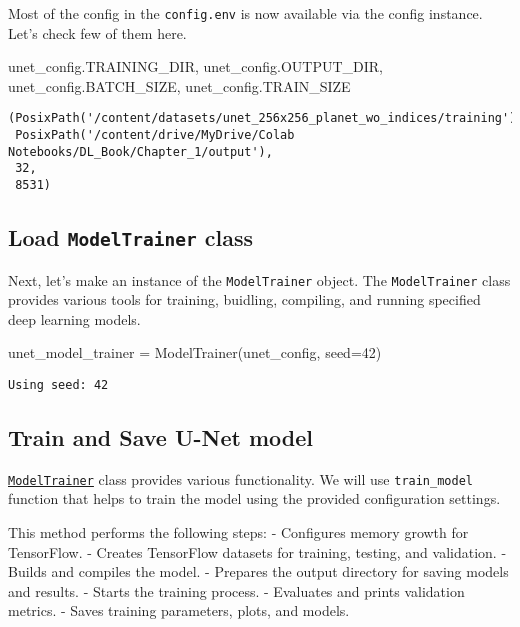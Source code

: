 \documentclass[
  letterpaper,
  DIV=11,
  numbers=noendperiod]{scrreprt}
\newenvironment{Shaded}{\begin{snugshade}}{\end{snugshade}}
\newcommand{\DecValTok}[1]{\textcolor[rgb]{0.68,0.00,0.00}{#1}}
\newcommand{\NormalTok}[1]{\textcolor[rgb]{0.00,0.23,0.31}{#1}}
\newcommand{\OperatorTok}[1]{\textcolor[rgb]{0.37,0.37,0.37}{#1}}
\begin{document}
Most of the config in the \texttt{config.env} is now available via the
config instance. Let's check few of them here.

\begin{Shaded}
\begin{Highlighting}[]
\NormalTok{unet\_config.TRAINING\_DIR, unet\_config.OUTPUT\_DIR, unet\_config.BATCH\_SIZE, unet\_config.TRAIN\_SIZE}
\end{Highlighting}
\end{Shaded}

\begin{verbatim}
(PosixPath('/content/datasets/unet_256x256_planet_wo_indices/training'),
 PosixPath('/content/drive/MyDrive/Colab Notebooks/DL_Book/Chapter_1/output'),
 32,
 8531)
\end{verbatim}

\subsection{\texorpdfstring{Load \texttt{ModelTrainer}
class}{Load ModelTrainer class}}\label{load-modeltrainer-class}

Next, let's make an instance of the \texttt{ModelTrainer} object. The
\texttt{ModelTrainer} class provides various tools for training,
buidling, compiling, and running specified deep learning models.

\begin{Shaded}
\begin{Highlighting}[]
\NormalTok{unet\_model\_trainer }\OperatorTok{=}\NormalTok{ ModelTrainer(unet\_config, seed}\OperatorTok{=}\DecValTok{42}\NormalTok{)}
\end{Highlighting}
\end{Shaded}

\begin{verbatim}
Using seed: 42
\end{verbatim}

\subsection{Train and Save U-Net
model}\label{train-and-save-u-net-model}

\href{https://servir.github.io/servir-aces/model_trainer/}{\texttt{ModelTrainer}}
class provides various functionality. We will use \texttt{train\_model}
function that helps to train the model using the provided configuration
settings.

This method performs the following steps: - Configures memory growth for
TensorFlow. - Creates TensorFlow datasets for training, testing, and
validation. - Builds and compiles the model. - Prepares the output
directory for saving models and results. - Starts the training process.
- Evaluates and prints validation metrics. - Saves training parameters,
plots, and models.
\end{document}
